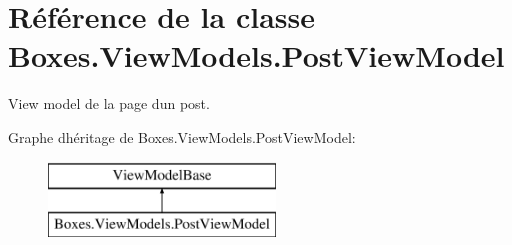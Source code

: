 \hypertarget{class_boxes_1_1_view_models_1_1_post_view_model}{}\section{Référence de la classe Boxes.\+View\+Models.\+Post\+View\+Model}
\label{class_boxes_1_1_view_models_1_1_post_view_model}


View model de la page d\textquotesingle{}un post.  


Graphe d\textquotesingle{}héritage de Boxes.\+View\+Models.\+Post\+View\+Model\+:\begin{figure}[H]
\begin{center}
\leavevmode
\includegraphics[height=2.000000cm]{class_boxes_1_1_view_models_1_1_post_view_model}
\end{center}
\end{figure}
